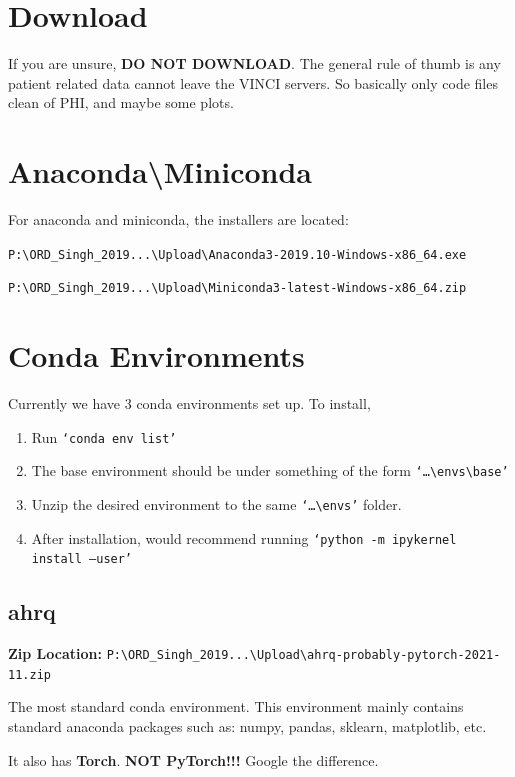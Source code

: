 \documentclass[12pt]{article}
\theoremstyle{definition}
\begin{document}
\section{Download}
If you are unsure, \textbf{DO NOT DOWNLOAD}. The general rule of thumb is any patient related data cannot leave the VINCI servers. So basically only code files clean of PHI, and maybe some plots.



\section{Anaconda\textbackslash Miniconda}
For anaconda and miniconda, the installers are located:

\texttt{P:\textbackslash ORD\_Singh\_2019...\textbackslash Upload\textbackslash Anaconda3-2019.10-Windows-x86\_64.exe}

\texttt{P:\textbackslash ORD\_Singh\_2019...\textbackslash Upload\textbackslash Miniconda3-latest-Windows-x86\_64.zip}


\section{Conda Environments}
Currently we have 3 conda environments set up. To install,\begin{enumerate}
    \item Run \texttt{`conda env list'}
    \item The base environment should be under something of the form \texttt{`\dots\textbackslash envs\textbackslash base'}
    \item Unzip the desired environment to the same \texttt{`\dots\textbackslash envs'} folder. 
    \item After installation, would recommend running \texttt{`python -m ipykernel install --user'} 
\end{enumerate}


\subsection{ahrq}
\textbf{Zip Location: }\texttt{P:\textbackslash ORD\_Singh\_2019...\textbackslash Upload\textbackslash ahrq-probably-pytorch-2021-11.zip}

The most standard conda environment. This environment mainly contains standard anaconda packages such as: numpy, pandas, sklearn, matplotlib, etc. 

It also has \textbf{Torch}. \textbf{NOT PyTorch!!!} Google the difference. 
\end{document}
